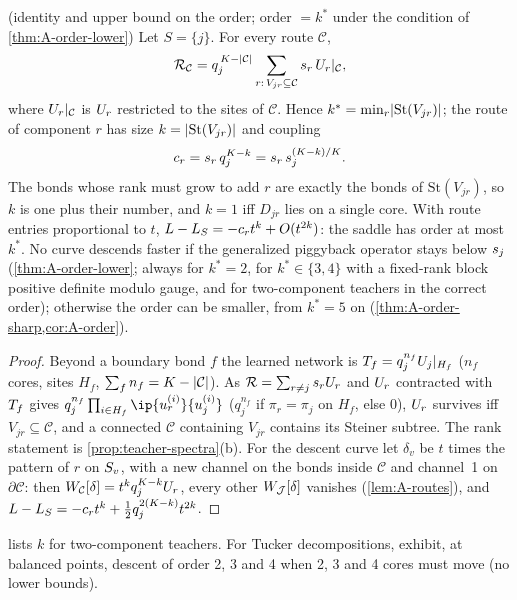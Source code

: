 \begin{proposition}\label{prop:A-steiner}
  \proven{} (identity and upper bound on the order; order $=k^*$ under the condition of
  \cref{thm:A-order-lower}) 
  Let $S=\{j\}$. For every route $\mathcal C$,
  \begin{equation}\label{eq:A-steiner}
    \mathcal R_{\mathcal C}=q_j^{\,K-\lvert\mathcal C\rvert}\sum_{r:\,V_{jr}\subseteq\mathcal C}s_{r}\,U_{r}|_{\mathcal C},
  \end{equation}
  where $U_{r}|_{\mathcal C}$ is $U_{r}$ restricted to the sites of $\mathcal C$. Hence
  $k^*=\min_r\lvert\mathrm{St}(V_{jr})\rvert$; the route of component $r$ has size
  $k=\lvert\mathrm{St}(V_{jr})\rvert$ and coupling
  \begin{equation}\label{eq:A-coupling}
    c_r=s_{r}\,q_j^{K-k}=s_{r}\,s_{j}^{(K-k)/K}.
  \end{equation}
  The bonds whose rank must grow to add $r$ are exactly the bonds of $\mathrm{St}(V_{jr})$, so $k$ is one
  plus their number, and $k=1$ iff $D_{jr}$ lies on a single core. With route entries proportional to
  $t$, $L-L_S=-c_rt^{k}+O(t^{2k})$: the saddle has order at most $k^*$. No curve descends faster if
  the generalized piggyback operator stays below $s_{j}$ (\cref{thm:A-order-lower}; always for $k^*=2$, for
  $k^*\in\{3,4\}$ with a fixed-rank block positive definite modulo gauge, and for two-component teachers in the correct
  order); otherwise the order can be smaller, from $k^*=5$ on (\cref{thm:A-order-sharp,cor:A-order}).
\end{proposition}
\begin{proof}
  Beyond a boundary bond $f$ the learned network is $T_{f}=q_j^{n_f}U_{j}|_{H_f}$ ($n_f$ cores, sites $H_f$,
  $\sum_fn_f=K-\lvert\mathcal C\rvert$). As $\mathcal R=\sum_{r\ne j}s_{r}U_{r}$ and $U_{r}$ contracted with $T_{f}$ gives
  $q_j^{n_f}\prod_{i\in H_f}\ip{\fac ri}{\fac ji}$ ($q_j^{n_f}$ if $\pi_r=\pi_j$ on $H_f$, else $0$), $U_{r}$ survives iff
  $V_{jr}\subseteq\mathcal C$, and a connected $\mathcal C$ containing $V_{jr}$ contains its Steiner subtree.
  The rank statement is \cref{prop:teacher-spectra}(b). For the descent curve let $\delta_v$ be $t$ times the
  pattern of $r$ on $S_{v}$, with a new channel on the bonds inside $\mathcal C$ and channel~1 on
  $\partial\mathcal C$: then $W_{\mathcal C}[\delta]=t^kq_j^{K-k}U_{r}$, every other $W_{\mathcal J}[\delta]$ vanishes
  (\cref{lem:A-routes}), and $L-L_S=-c_rt^k+\frac12q_j^{2(K-k)}t^{2k}$.
\end{proof}
 lists $k$ for two-component teachers. For Tucker decompositions,
\citet[proof of Lemma~7]{frandsen2022optimization} exhibit, at balanced points, descent of order 2, 3 and 4
when 2, 3 and 4 cores must move (no lower bounds).

